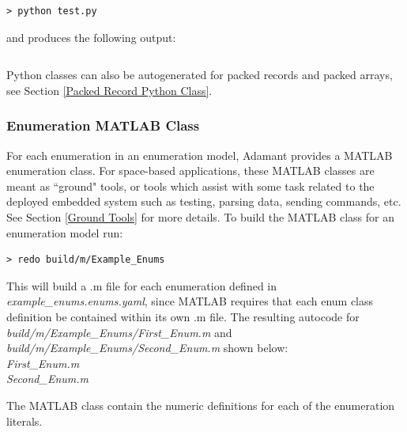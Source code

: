 \vspace{5mm} %
\begin{verbatim}
> python test.py
\end{verbatim}
\vspace{5mm} %

and produces the following output:

\vspace{5mm} %
\inputminted{text}{../example_architecture/enum_py/output.txt}
\vspace{5mm} %

Python classes can also be autogenerated for packed records and packed arrays, see Section \ref{Packed Record Python Class}.

\subsubsection{Enumeration MATLAB Class}

For each enumeration in an enumeration model, Adamant provides a MATLAB enumeration class. For space-based applications, these MATLAB classes are meant as ``ground" tools, or tools which assist with some task related to the deployed embedded system such as testing, parsing data, sending commands, etc. See Section \ref{Ground Tools} for more details. To build the MATLAB class for an enumeration model run:

\vspace{5mm} %
\begin{verbatim}
> redo build/m/Example_Enums
\end{verbatim}
\vspace{5mm} %

This will build a .m file for each enumeration defined in \textit{example\_enums.enums.yaml}, since MATLAB requires that each enum class definition be contained within its own .m file. The resulting autocode for \textit{build/m/Example\_Enums/First\_Enum.m} and \textit{build/m/Example\_Enums/Second\_Enum.m} shown below: \\

\textit{First\_Enum.m}
 \\

\textit{Second\_Enum.m}

The MATLAB class contain the numeric definitions for each of the enumeration literals.

